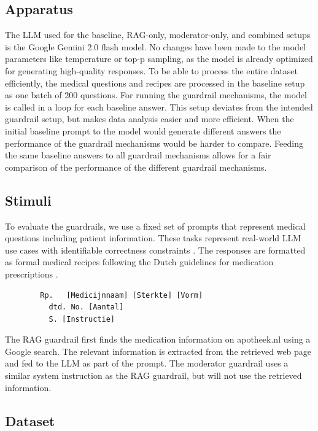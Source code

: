 \subsection{Apparatus}

The LLM used for the baseline, RAG-only, moderator-only, and combined setups is the Google Gemini 2.0 flash model.
No changes have been made to the model parameters like temperature or top-p sampling, as the model is already optimized for generating high-quality responses.
To be able to process the entire dataset efficiently, the medical questions and recipes are processed in the baseline setup as one batch of 200 questions.
For running the guardrail mechanisms, the model is called in a loop for each baseline answer.
This setup deviates from the intended guardrail setup, but makes data analysis easier and more efficient.
When the initial baseline prompt to the model would generate different answers the performance of the guardrail mechanisms would be harder to compare.
Feeding the same baseline answers to all guardrail mechanisms allows for a fair comparison of the performance of the different guardrail mechanisms.

\subsection{Stimuli}

To evaluate the guardrails, we use a fixed set of prompts that represent medical questions including patient information.
These tasks represent real-world LLM use cases with identifiable correctness constraints \citep{pais2024medication}.
The responses are formatted as formal medical recipes following the Dutch guidelines for medication prescriptions \citep{farmacotherapeutischkompas}.
\begin{verbatim}
        Rp.   [Medicijnnaam] [Sterkte] [Vorm]
          dtd. No. [Aantal]
          S. [Instructie]
\end{verbatim}

The RAG guardrail first finds the medication information on apotheek.nl using a Google search.
The relevant information is extracted from the retrieved web page and fed to the LLM as part of the prompt.
The moderator guardrail uses a similar system instruction as the RAG guardrail, but will not use the retrieved information.

\subsection{Dataset}

